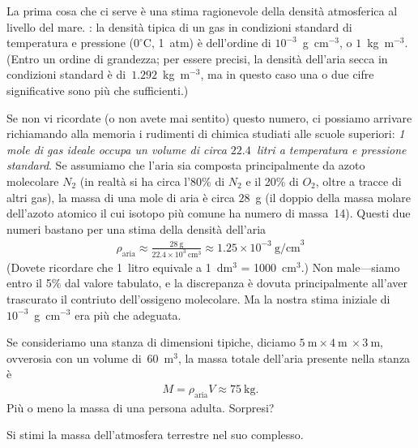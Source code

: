 \begin{solution}

La prima cosa che ci serve \`e una stima ragionevole della densit\`a atmosferica
al livello del mare. : la densit\`a tipica di un gas in
condizioni standard di temperatura e pressione ($0^\circ$C, 1~atm) \`e
dell'ordine di $10^{-3}$~g~cm$^{-3}$, o $1$~kg~m$^{-3}$. (Entro un ordine di grandezza;
per essere precisi, la densit\`a dell'aria secca in condizioni standard \`e
di~$1.292$~kg~m$^{-3}$, ma in questo caso una o due cifre significative sono
pi\`u che sufficienti.)

Se non vi ricordate (o non avete mai sentito) questo numero, ci possiamo arrivare
richiamando alla memoria i rudimenti di chimica studiati alle scuole superiori:
\emph{1 mole di gas ideale occupa un volume di circa $22.4$~litri a temperatura e
pressione standard}. Se assumiamo che l'aria sia composta principalmente da azoto
molecolare $N_2$ (in realt\`a si ha circa l'80\% di $N_2$ e il 20\% di $O_2$,
oltre a tracce di altri gas), la massa di una mole di aria \`e circa $28$~g
(il doppio della massa molare dell'azoto atomico il cui isotopo pi\`u comune
ha numero di massa~14). Questi due numeri bastano per una stima della densit\`a
dell'aria
\begin{align}
  \rho_\text{aria} \approx \frac{28~\text{g}}{22.4 \times 10^3~\text{cm}^3}
  \approx 1.25 \times 10^{-3}~\text{g/cm}^3
\end{align}
(Dovete ricordare che 1~litro equivale a 1~dm$^3$ = 1000~cm$^3$.) Non male---siamo
entro il 5\% dal valore tabulato, e la discrepanza \`e dovuta principalmente
all'aver trascurato il contriuto dell'ossigeno molecolare. Ma la nostra stima
iniziale di $10^{-3}$~g~cm$^{-3}$ era pi\`u che adeguata.

Se consideriamo una stanza di dimensioni tipiche, diciamo
$5~\text{m} \times 4~\text{m}~\times 3~\text{m}$, ovverosia con un volume
di~$60$~m$^3$, la massa totale dell'aria presente nella stanza \`e
\begin{align}
  M = \rho_\text{aria} V \approx 75~\text{kg}.
\end{align}
Pi\`u o meno la massa di una persona adulta. Sorpresi?

\end{solution}


\begin{exercise}

Si stimi la massa dell'atmosfera terrestre nel suo complesso.

\end{exercise}


